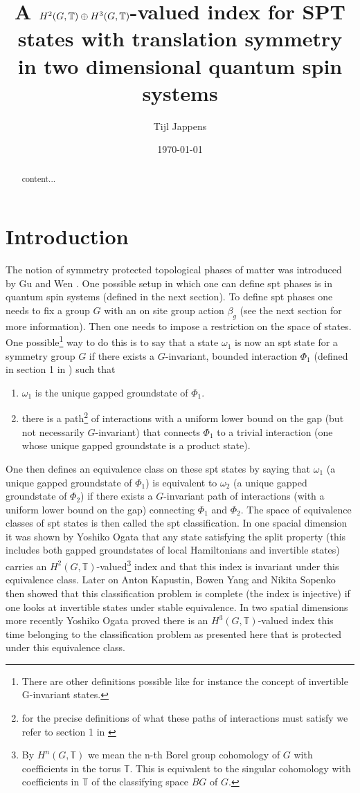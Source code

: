 \documentclass[12pt,a4paper,twoside]{article}
\title{A $H^2(G,\TT)\oplus H^3(G,\TT)$-valued index for SPT states with translation symmetry in two dimensional quantum spin systems}
\author{Tijl Jappens}
\date{\today}
\newcommand{\TT}{\mathbb T}
\theoremstyle{definition}
\numberwithin{equation}{section}
\begin{document}
\maketitle	
\begin{abstract}
	content...
\end{abstract}
\section{Introduction}
The notion of symmetry protected topological phases of matter was introduced by Gu and Wen \cite{Chen_2013}. One possible setup in which one can define spt phases is in quantum spin systems (defined in the next section). To define spt phases one needs to fix a group $G$ with an on site group action $\beta_g$ (see the next section for more information). Then one needs to impose a restriction on the space of states. One possible\footnote{There are other definitions possible like for instance the concept of invertible G-invariant states.} way to do this is to say that a state $\omega_1$ is now an spt state for a symmetry group $G$ if there exists a $G$-invariant, bounded interaction $\Phi_1$ (defined in section 1 in \cite{ogata2021h3gmathbb}) such that
\begin{enumerate}
	\item $\omega_1$ is the unique gapped groundstate of $\Phi_1$.
	\item there is a path\footnote{for the precise definitions of what these paths of interactions must satisfy we refer to section 1 in \cite{ogata2021h3gmathbb}} of interactions with a uniform lower bound on the gap (but not necessarily $G$-invariant) that connects $\Phi_1$ to a trivial interaction (one whose unique gapped groundstate is a product state).
\end{enumerate}
One then defines an equivalence class on these spt states by saying that $\omega_1$ (a unique gapped groundstate of $\Phi_1$) is equivalent to $\omega_2$ (a unique gapped groundstate of $\Phi_2$) if there exists a $G$-invariant path of interactions (with a uniform lower bound on the gap) connecting $\Phi_1$ and $\Phi_2$. The space of equivalence classes of spt states is then called the spt classification. In one spacial dimension it was shown by Yoshiko Ogata \cite{ogata2019classification} that any state satisfying the split property (this includes both gapped groundstates of local Hamiltonians and invertible states) carries an $H^2(G,\TT)$-valued\footnote{By $H^n(G,\TT)$ we mean the n-th Borel group cohomology of $G$ with coefficients in the torus $\TT$. This is equivalent to the singular cohomology with coefficients in $\TT$ of the classifying space $BG$ of $G$.} index and that this index is invariant under this equivalence class. Later on Anton Kapustin, Bowen Yang and Nikita Sopenko \cite{kapustin2021classification} then showed that this classification problem is complete (the index is injective) if one looks at invertible states under stable equivalence. In two spatial dimensions more recently Yoshiko Ogata \cite{ogata2021h3gmathbb} proved there is an $H^3(G,\TT)$-valued index this time belonging to the classification problem as presented here that is protected under this equivalence class.
\end{document}
